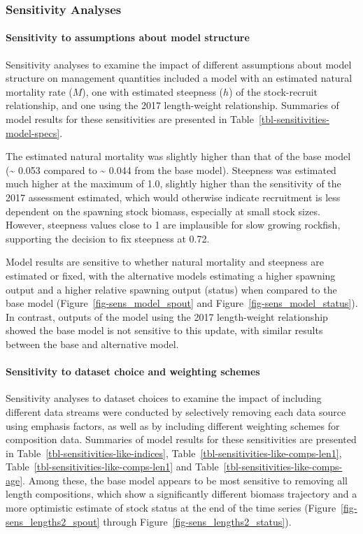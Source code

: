 \documentclass[
]{scrartcl}
\let\oldparagraph\paragraph
\renewcommand{\paragraph}[1]{\oldparagraph{#1}\mbox{}}
\begin{document}
\subsubsection{Sensitivity Analyses}\label{sensitivity-analyses}

\paragraph{Sensitivity to assumptions about model
structure}\label{sensitivity-to-assumptions-about-model-structure}

Sensitivity analyses to examine the impact of different assumptions
about model structure on management quantities included a model with an
estimated natural mortality rate (\(M\)), one with estimated steepness
(\(h\)) of the stock-recruit relationship, and one using the 2017
length-weight relationship. Summaries of model results for these
sensitivities are presented in
Table~\ref{tbl-sensitivities-model-specs}.

The estimated natural mortality was slightly higher than that of the
base model (\textasciitilde{} 0.053 compared to \textasciitilde{} 0.044
from the base model). Steepness was estimated much higher at the maximum
of 1.0, slightly higher than the sensitivity of the 2017 assessment
estimated, which would otherwise indicate recruitment is less dependent
on the spawning stock biomass, especially at small stock sizes. However,
steepness values close to 1 are implausible for slow growing rockfish,
supporting the decision to fix steepness at 0.72.

Model results are sensitive to whether natural mortality and steepness
are estimated or fixed, with the alternative models estimating a higher
spawning output and a higher relative spawning output (status) when
compared to the base model (Figure~\ref{fig-sens_model_spout} and
Figure~\ref{fig-sens_model_status}). In contrast, outputs of the model
using the 2017 length-weight relationship showed the base model is not
sensitive to this update, with similar results between the base and
alternative model.

\paragraph{Sensitivity to dataset choice and weighting
schemes}\label{sensitivity-to-dataset-choice-and-weighting-schemes}

Sensitivity analyses to dataset choices to examine the impact of
including different data streams were conducted by selectively removing
each data source using emphasis factors, as well as by including
different weighting schemes for composition data. Summaries of model
results for these sensitivities are presented in
Table~\ref{tbl-sensitivities-like-indices},
Table~\ref{tbl-sensitivities-like-comps-len1},
Table~\ref{tbl-sensitivities-like-comps-len1} and
Table~\ref{tbl-sensitivities-like-comps-age}. Among these, the base
model appears to be most sensitive to removing all length compositions,
which show a significantly different biomass trajectory and a more
optimistic estimate of stock status at the end of the time series
(Figure~\ref{fig-sens_lengths2_spout} through
Figure~\ref{fig-sens_lengths2_status}).
\end{document}

